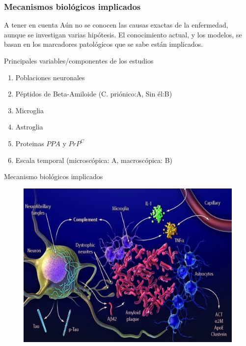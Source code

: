 \documentclass{beamer}
\begin{document}
\begin{frame}
  \frametitle{Mecanismos biológicos implicados}

  \begin{block}{A tener en cuenta}
    Aún no se conocen las causas exactas de la enfermedad, aunque se investigan varias hipótesis.
    El conocimiento actual, y los modelos, se basan en los marcadores patológicos que se sabe están implicados.
  \end{block}
  \begin{block}{Principales variables/componentes de los estudios}
    \begin{enumerate}
    	\item Poblaciones neuronales
    	\item Péptidos de Beta-Amiloide (C. priónico:A, Sin él:B)
    	\item Microglia
    	\item Astroglia
    	\item Proteinas $PPA$ y $PrP^C$
    	\item Escala temporal (microscópica: A, macroscópica: B)
    \end{enumerate}
      \end{block}
\end{frame}

\begin{frame}{Mecanismo biológicos implicados}
	\begin{figure}[Atrofia cerebral]
		\includegraphics[scale=0.9]{imagen.jpg}
		\label{cerebro4}
	\end{figure}
\end{frame}
\end{document}
